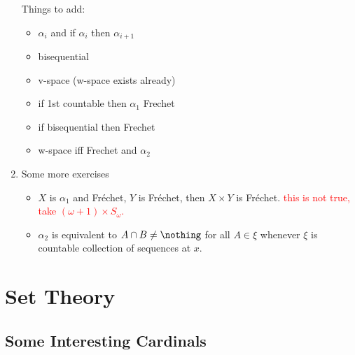 \documentclass{article}
\begin{document}
\begin{enumerate}
    Things to add:
    \begin{itemize}
        \item \(\alpha_i\) and if \(\alpha_i\) then \(\alpha_{i + 1}\)
        \item bisequential
        \item v-space (w-space exists already)
        \item if 1st countable then \(\alpha_1\) Frechet
        \item if bisequential then Frechet
        \item w-space iff Frechet and \(\alpha_2\)   
    \end{itemize}
    \item Some more exercises 
    \begin{itemize}
        \item \(X\) is \(\alpha_1\) and Fréchet, \(Y\) is Fréchet, then \(X \times Y\) is Fréchet. \textcolor{red}{this is not true, take $(\omega + 1) \times S_{\omega}$.}
        \item \(\alpha_2\) is equivalent to \(A \cap B \neq \nothing\) for all \(A \in \xi\) whenever \(\xi\) is countable collection of sequences at \(x\). \checkmark
    \end{itemize}
\end{enumerate}
\section{Set Theory}

\subsection{Some Interesting Cardinals}
\end{document}
